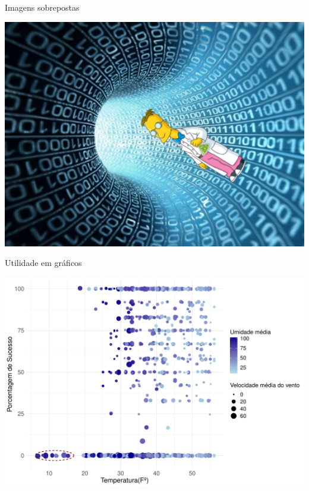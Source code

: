 \documentclass[
  ignorenonframetext,
]{beamer}
\begin{document}
\begin{frame}{Imagens sobrepostas}
\protect\hypertarget{imagens-sobrepostas-3}{}

\includegraphics[width=6.11in]{SLIDES_files/figure-beamer/5.4-1}

\end{frame}

\begin{frame}{Utilidade em gráficos}
\protect\hypertarget{utilidade-em-gruxe1ficos}{}

\small

\includegraphics{SLIDES_files/figure-beamer/5.6-1.pdf}

\end{frame}
\end{document}
